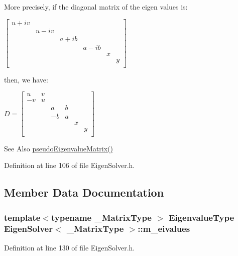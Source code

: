 More precisely, if the diagonal matrix of the eigen values is\-:\par
 $ \left[ \begin{array}{cccccc} u+iv & & & & & \\ & u-iv & & & & \\ & & a+ib & & & \\ & & & a-ib & & \\ & & & & x & \\ & & & & & y \\ \end{array} \right] $ \par
 then, we have\-:\par
 $ D =\left[ \begin{array}{cccccc} u & v & & & & \\ -v & u & & & & \\ & & a & b & & \\ & & -b & a & & \\ & & & & x & \\ & & & & & y \\ \end{array} \right] $

\begin{DoxySeeAlso}{See Also}
\hyperlink{class_eigen_solver_a5db680e1e08078ed30e477322409f12e}{pseudo\-Eigenvalue\-Matrix()} 
\end{DoxySeeAlso}


Definition at line 106 of file Eigen\-Solver.\-h.



\subsection{Member Data Documentation}
\hypertarget{class_eigen_solver_afe25fa1caa5b650612c712a333ae14d6}{
\subsubsection[{m\-\_\-eivalues}]{\setlength{\rightskip}{0pt plus 5cm}template$<$typename \-\_\-\-Matrix\-Type $>$ {\bf Eigenvalue\-Type} {\bf Eigen\-Solver}$<$ \-\_\-\-Matrix\-Type $>$\-::m\-\_\-eivalues\hspace{0.3cm}{\ttfamily [protected]}}}\label{class_eigen_solver_afe25fa1caa5b650612c712a333ae14d6}


Definition at line 130 of file Eigen\-Solver.\-h.

